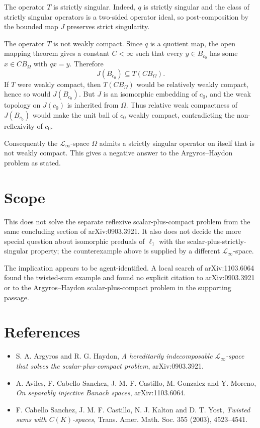 \documentclass[11pt]{article}
\newcommand{\cnull}{c_0}
\newcommand{\Linf}{\mathcal L_\infty}
\begin{document}
The operator \(T\) is strictly singular.  Indeed, \(q\) is strictly singular
and the class of strictly singular operators is a two-sided operator ideal, so
post-composition by the bounded map \(J\) preserves strict singularity.

The operator \(T\) is not weakly compact.  Since \(q\) is a quotient map, the
open mapping theorem gives a constant \(C<\infty\) such that every
\(y\in B_{\cnull}\) has some \(x\in C B_\Omega\) with \(q x=y\).  Therefore
\[
  J(B_{\cnull})\subseteq T(CB_\Omega).
\]
If \(T\) were weakly compact, then \(T(CB_\Omega)\) would be relatively weakly
compact, hence so would \(J(B_{\cnull})\).  But \(J\) is an isomorphic
embedding of \(\cnull\), and the weak topology on \(J(\cnull)\) is inherited
from \(\Omega\).  Thus relative weak compactness of \(J(B_{\cnull})\) would
make the unit ball of \(\cnull\) weakly compact, contradicting the
non-reflexivity of \(\cnull\).

Consequently the \(\mathcal L_\infty\)-space \(\Omega\) admits a strictly
singular operator on itself that is not weakly compact.  This gives a negative
answer to the Argyros--Haydon problem as stated.

\section{Scope}

This does not solve the separate reflexive scalar-plus-compact problem from
the same concluding section of arXiv:0903.3921.  It also does not decide the
more special question about isomorphic preduals of \(\ell_1\) with the
scalar-plus-strictly-singular property; the counterexample above is supplied
by a different \(\mathcal L_\infty\)-space.

The implication appears to be agent-identified.  A local search of
arXiv:1103.6064 found the twisted-sum example and found no explicit citation
to arXiv:0903.3921 or to the Argyros--Haydon scalar-plus-compact problem in
the supporting passage.

\section{References}

\begin{itemize}[leftmargin=*]
\item S. A. Argyros and R. G. Haydon, \emph{A hereditarily indecomposable
\(\Linf\)-space that solves the scalar-plus-compact problem},
arXiv:0903.3921.
\item A. Aviles, F. Cabello Sanchez, J. M. F. Castillo, M. Gonzalez and
Y. Moreno, \emph{On separably injective Banach spaces}, arXiv:1103.6064.
\item F. Cabello Sanchez, J. M. F. Castillo, N. J. Kalton and D. T. Yost,
\emph{Twisted sums with \(C(K)\)-spaces}, Trans. Amer. Math. Soc. 355
(2003), 4523--4541.
\end{itemize}
\end{document}
